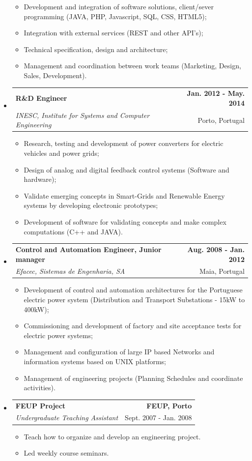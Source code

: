 \documentclass[letterpaper,11pt]{article}
\makeatletter
\newcommand{\resitem}[1]{\item #1 \vspace{2pt}}
\newcommand{\ressubheading}[4]
{
    \begin{tabular*}{6.5in}{@{\extracolsep{\fill}}l r}
        {\textbf{#1}}&{\textbf{#2}}\\
        {\textit{#3}}&{#4}
    \end{tabular*}
}
\makeatother
\begin{document}
\begin{itemize}
\begin{itemize}
		\resitem{Development and integration of software solutions, client/sever programming (JAVA, PHP, Javascript, SQL, CSS, HTML5);}
		\resitem{Integration with external services (REST and other API's);}
		\resitem{Technical specification, design and architecture;}
		\resitem{Management and coordination between work teams (Marketing, Design, Sales, Development).}
	\end{itemize}
\item
	\ressubheading{R\&D Engineer}{Jan. 2012 - May. 2014}{INESC, Institute for Systems and Computer Engineering}{Porto, Portugal}%
	\begin{itemize}
		\resitem{Research, testing and development of power converters for electric vehicles and power grids;}
        \resitem{Design of analog and digital feedback control systems (Software and hardware);}
		\resitem{Validate emerging concepts in Smart-Grids and Renewable Energy systems  by developing electronic prototypes;}
        \resitem{Development of software for validating concepts and make complex computations (C++ and JAVA).}
	\end{itemize}

\item 
	\ressubheading{Control and Automation Engineer, Junior manager}{Aug. 2008 - Jan. 2012}{Efacec, Sistemas de Engenharia, SA}{Maia, Portugal} %
	\begin{itemize}
		\resitem{Development of control and automation architectures for the Portuguese electric power system (Distribution and Transport Substations - 15kW to 400kW);} %
		\resitem{Commissioning and development of factory and site acceptance tests for electric power systems;}
		\resitem{Management and configuration of large IP based Networks and information systems based on UNIX platforms;}
		\resitem{Management of engineering projects (Planning Schedules and coordinate activities).}
	\end{itemize}
\item
	\ressubheading{FEUP Project}{FEUP, Porto}{Undergraduate Teaching Assistant}{Sept. 2007 - Jan. 2008}%
	\begin{itemize}
		\resitem{Teach how to organize and develop an engineering project.}
		\resitem{Led weekly course seminars.}
	\end{itemize}
\end{itemize}
\end{document}
